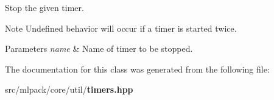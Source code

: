 Stop the given timer. 

\begin{DoxyNote}{Note}
Undefined behavior will occur if a timer is started twice.
\end{DoxyNote}

\begin{DoxyParams}{Parameters}
{\em name} & Name of timer to be stopped. \\
\hline
\end{DoxyParams}


The documentation for this class was generated from the following file\-:\begin{DoxyCompactItemize}
\item 
src/mlpack/core/util/{\bf timers.\-hpp}\end{DoxyCompactItemize}
